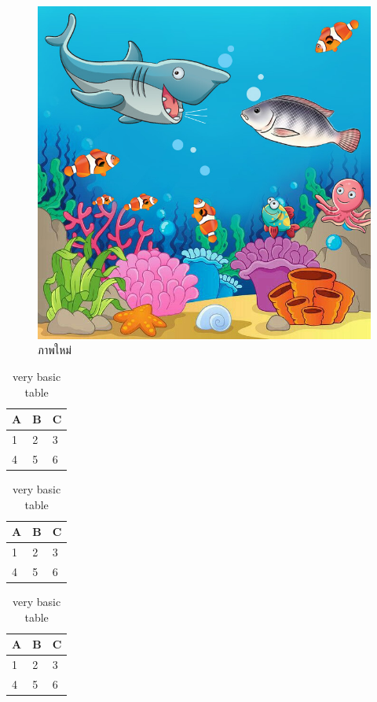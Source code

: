 \begin{figure}[htb]
	\centering
    \includegraphics[scale=0.5]{chapter1/images/test_image.jpg}
    \caption{ภาพใหม่}
\end{figure}
\begin{table}[htb]
	\centering
	\begin{tabular}{l | l | l}
		A & B & C \\
		\hline
		1 & 2 & 3 \\
		4 & 5 & 6 
	\end{tabular}
	\caption{very basic table}
	\label{tab:abc}
\end{table}
\begin{table}[htb]
	\centering
	\begin{tabular}{l | l | l}
		A & B & C \\
		\hline
		1 & 2 & 3 \\
		4 & 5 & 6 
	\end{tabular}
	\caption{very basic table}
	\label{tab:abc}
\end{table}
\begin{table}[htb]
	\centering
	\begin{tabular}{l | l | l}
		A & B & C \\
		\hline
		1 & 2 & 3 \\
		4 & 5 & 6 
	\end{tabular}
	\caption{very basic table}
	\label{tab:abc}
\end{table}
